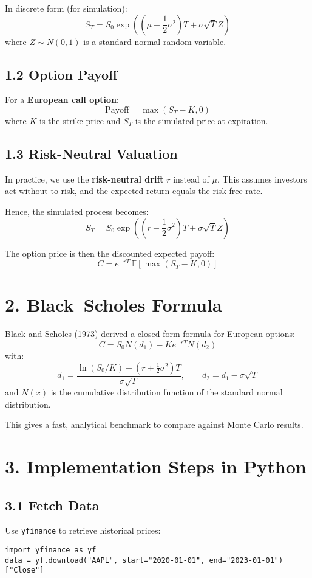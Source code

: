 \documentclass[12pt]{article}
\begin{document}
In discrete form (for simulation):
\[
S_T = S_0 \exp \left( (\mu - \frac{1}{2}\sigma^2)T + \sigma \sqrt{T} Z \right)
\]
where $Z \sim N(0,1)$ is a standard normal random variable.



\subsection{1.2 Option Payoff}
For a \textbf{European call option}:
\[
\text{Payoff} = \max(S_T - K, 0)
\]
where $K$ is the strike price and $S_T$ is the simulated price at expiration.



\subsection{1.3 Risk-Neutral Valuation}
In practice, we use the \textbf{risk-neutral drift} $r$ instead of $\mu$.  
This assumes investors act without  to risk, and the expected return equals the risk-free rate.

Hence, the simulated process becomes:
\[
S_T = S_0 \exp \left( (r - \frac{1}{2}\sigma^2)T + \sigma \sqrt{T} Z \right)
\]

The option price is then the discounted expected payoff:
\[
C = e^{-rT} \, \mathbb{E}[\max(S_T - K, 0)]
\]



\section{2. Black--Scholes Formula}
Black and Scholes (1973) derived a closed-form formula for European options:
\[
C = S_0 N(d_1) - K e^{-rT} N(d_2)
\]
with:
\[
d_1 = \frac{\ln(S_0 / K) + (r + \frac{1}{2}\sigma^2)T}{\sigma \sqrt{T}}, \qquad
d_2 = d_1 - \sigma \sqrt{T}
\]
and $N(x)$ is the cumulative distribution function of the standard normal distribution.

This gives a fast, analytical benchmark to compare against Monte Carlo results.



\section{3. Implementation Steps in Python}

\subsection{3.1 Fetch Data}
Use \texttt{yfinance} to retrieve historical prices:
\begin{verbatim}
import yfinance as yf
data = yf.download("AAPL", start="2020-01-01", end="2023-01-01")["Close"]
\end{verbatim}
\end{document}
